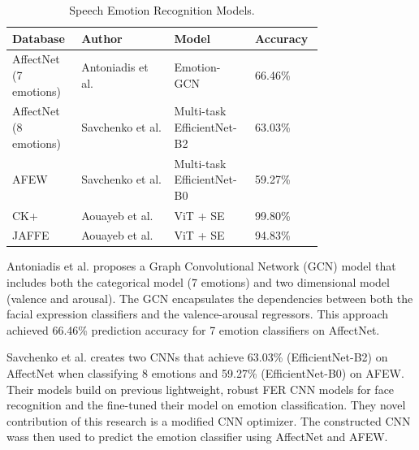     \begin{table}[ht]
        \centering
        \begin{tabular}{|p{0.16\linewidth}|p{0.27\linewidth}|p{0.21\linewidth}|p{0.12\linewidth}|}
        \hline
        Database & Author & Model & Accuracy\\\hline
        
        AffectNet (7 emotions)
        & Antoniadis et al. \cite{antoniadis_exploiting_2021}
        & Emotion-GCN
        & 66.46\%\\\hline
        
        AffectNet (8 emotions)
        & Savchenko et al. \cite{savchenko-2022}
        & Multi-task EfficientNet-B2
        & 63.03\%\\\hline

        AFEW
        & Savchenko et al. \cite{savchenko-2022}
        & Multi-task EfficientNet-B0
        & 59.27\%\\\hline
        
        CK+
        & Aouayeb et al. \cite{aouayeb-2021}
        & ViT + SE
        & 99.80\%\\\hline

        JAFFE
        & Aouayeb et al. \cite{aouayeb-2021}
        & ViT + SE
        & 94.83\%\\\hline
        
        \end{tabular}
        \caption{\label{tab:speech}Speech Emotion Recognition Models.}
    \end{table}

    Antoniadis et al. \cite{antoniadis_exploiting_2021} proposes a Graph Convolutional Network (GCN) model that includes both the categorical model (7 emotions) and two dimensional model (valence and arousal). The GCN encapsulates the dependencies between both the facial expression classifiers and the valence-arousal regressors. This approach achieved 66.46\% prediction accuracy for 7 emotion classifiers on AffectNet. 
    
    Savchenko et al. \cite{savchenko-2022} creates two CNNs that achieve 63.03\% (EfficientNet-B2) on AffectNet when classifying 8 emotions and 59.27\% (EfficientNet-B0) on AFEW. Their models build on previous lightweight, robust FER CNN models for face recognition and the fine-tuned their model on emotion classification. They novel contribution of this research is a modified CNN optimizer. The constructed CNN wass then used to predict the emotion classifier using AffectNet and AFEW.
    

